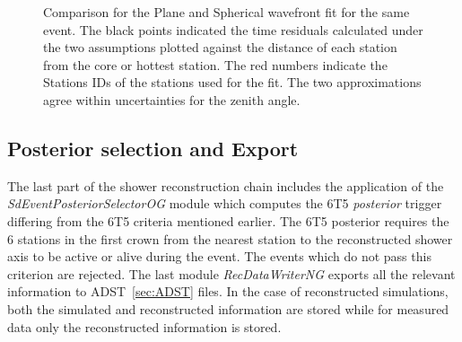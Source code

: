 \begin{figure}[h!]
  \centering
  \hfill
  
\caption{Comparison for the Plane and Spherical wavefront fit for the same event. The black points indicated the time residuals calculated under the two assumptions plotted against the distance of each station from the core or hottest station. The red numbers indicate the Stations IDs of the stations used  for the fit. The two approximations agree within uncertainties for the zenith angle.}
  \label{fig:Wavefront_comp}
\end{figure}

\subsection{Posterior selection and Export}
\label{subsec:reco_possel}

The last part of the shower reconstruction chain includes the application of the \textit{SdEventPosteriorSelectorOG} module which computes the 6T5 \textit{posterior} trigger differing from the 6T5 criteria mentioned earlier. The 6T5 posterior requires the 6 stations in the first crown from the nearest station to the reconstructed shower axis to be active or alive during the event. The events which do not pass this criterion are rejected. The last module \textit{RecDataWriterNG} exports all the relevant information to ADST~\ref{sec:ADST} files. In the case of reconstructed simulations, both the simulated and reconstructed information are stored while for measured data only the reconstructed information is stored.

